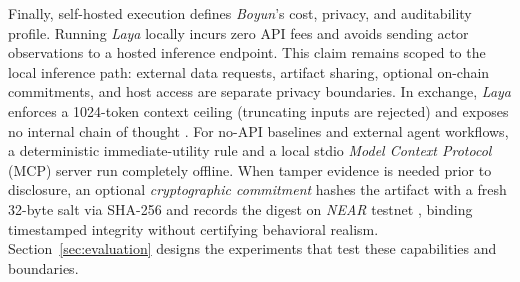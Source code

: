 Finally, self-hosted execution defines \textit{Boyun}'s cost, privacy, and
auditability profile. Running \textit{Laya} locally incurs zero API fees and
avoids sending actor observations to a hosted inference endpoint. This claim
remains scoped to the local inference path: external data requests, artifact
sharing, optional on-chain commitments, and host access are separate privacy
boundaries. In exchange, \textit{Laya} enforces a 1024-token context ceiling
(truncating inputs are rejected) and exposes no internal chain of thought
\cite{layamodel}. For no-API baselines and external agent workflows, a
deterministic immediate-utility rule and a local stdio \textit{Model Context
Protocol} (MCP) server \cite{mcp2025} run completely offline. When tamper
evidence is needed prior to disclosure, an optional \textit{cryptographic
commitment} hashes the artifact with a fresh 32-byte salt via SHA-256 and
records the digest on \textit{NEAR} testnet \cite{nearprotocol,nightshade2024},
binding timestamped integrity without certifying behavioral realism.
Section~\ref{sec:evaluation} designs the experiments that test these
capabilities and boundaries.
